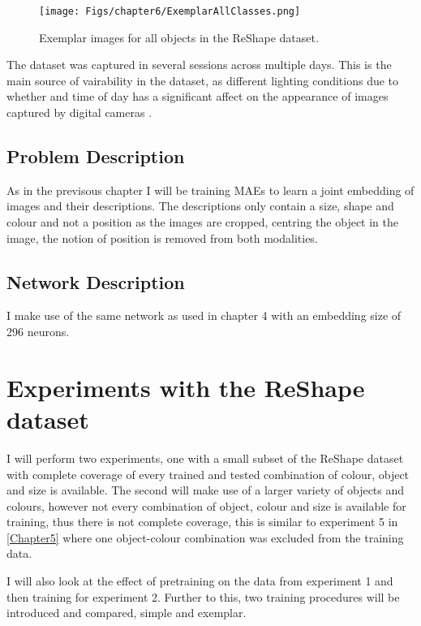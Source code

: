 \newpage
\begin{figure}[h!]
    \centering
    \texttt{[image: Figs/chapter6/ExemplarAllClasses.png]}
    \caption{Exemplar images for all objects in the ReShape dataset.}
    \label{fig:ReShapeAll}
\end{figure}

The dataset was captured in several sessions across multiple days. This is the main source of vairability in the dataset, as different lighting conditions due to whether and time of day has a significant affect on the appearance of images captured by digital cameras \cite{keller2016analysis, keller}.



\subsection{Problem Description}
As in the previsous chapter I will be training \acp{MAE} to learn a joint embedding of images and their descriptions. The descriptions only contain a size, shape and colour and not a position as the images are cropped, centring the object in the image, the notion of position is removed from both modalities.

\subsection{Network Description}
I make use of the same network as used in chapter 4 with an embedding size of 296 neurons. 

\section{Experiments with the ReShape dataset}
I will perform two experiments, one with a small subset of the ReShape dataset with complete coverage of every trained and tested combination of colour, object and size is available. The second will make use of a larger variety of objects and colours, however not every combination of object, colour and size is available for training, thus there is not complete coverage, this is similar to experiment 5 in \autoref{Chapter5} where one object-colour combination was excluded from the training data. 

I will also look at the effect of pretraining on the data from experiment 1 and then training for experiment 2. Further to this, two training procedures will be introduced and compared, simple and exemplar.

